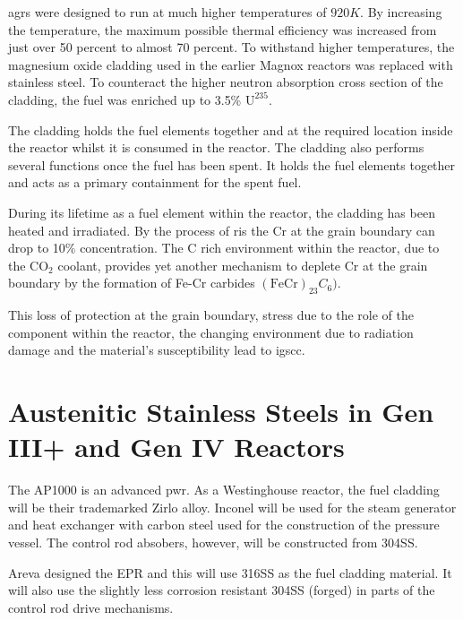 \acrshort{agr}s were designed to run at much higher temperatures of $920K$.  By increasing the temperature, the maximum possible thermal efficiency was increased from just over 50 percent to almost 70 percent.  To withstand higher temperatures, the magnesium oxide cladding used in the earlier Magnox reactors was replaced with stainless steel.  To counteract the higher neutron absorption cross section of the cladding, the fuel was enriched up to 3.5\% $\text{U}^{235}$.

The cladding holds the fuel elements together and at the required location inside the reactor whilst it is consumed in the reactor.  The cladding also performs several functions once the fuel has been spent.  It holds the fuel elements together and acts as a primary containment for the spent fuel\cite{agrfuelstorage}.

During its lifetime as a fuel element within the reactor, the cladding has been heated and irradiated.  By the process of \acrshort{ris} the Cr at the grain boundary can drop to 10\% concentration\cite{agrigscc}.  The C rich environment within the reactor, due to the $\text{CO}_{2}$ coolant, provides yet another mechanism to deplete Cr at the grain boundary by the formation of Fe-Cr carbides $(\text{Fe}\text{Cr})_{23} C_{6})$.  

This loss of protection at the grain boundary, stress due to the role of the component within the reactor, the changing environment due to radiation damage and the material's susceptibility lead to \acrshort{igscc}.




\FloatBarrier



\section[SS in Gen III+ and Gen IV]{Austenitic Stainless Steels in Gen III+ and Gen IV Reactors}

The AP1000 is an advanced \acrshort{pwr}.  As a Westinghouse reactor, the fuel cladding will be their trademarked Zirlo alloy.  Inconel will be used for the steam generator and heat exchanger with carbon steel used for the construction of the pressure vessel.  The control rod absobers, however, will be constructed from \gls{304SS}\cite{ap1000mat}.

Areva designed the EPR and this will use \gls{316SS} as the fuel cladding material.  It will also use the slightly less corrosion resistant \gls{304SS} (forged) in parts of the control rod drive mechanisms\cite{eprmat}.

